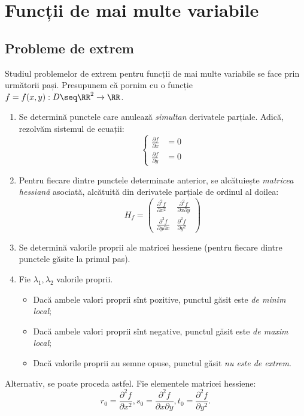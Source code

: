 \chapter{Funcții de mai multe variabile}

\section{Probleme de extrem}

Studiul problemelor de extrem pentru funcții de mai multe variabile
se face prin următorii pași. Presupunem că pornim cu o funcție
$ f = f(x, y) : D \seq \RR^2 \to \RR $.

\begin{enumerate}[(1)]
\item Se determină punctele care anulează \emph{simultan} derivatele
  parțiale. Adică, rezolvăm sistemul de ecuații:
  \[
    \begin{cases}
      \frac{\partial f}{\partial x} &= 0 \\
      \frac{\partial f}{\partial y} &= 0
    \end{cases}
  \]
\item Pentru fiecare dintre punctele determinate anterior, se alcătuiește
  \emph{matricea hessiană} asociată, alcătuită din derivatele parțiale
  de ordinul al doilea: 
  \[
    H_f =
    \begin{pmatrix}
      \frac{\partial^2 f}{\partial x^2} & \frac{\partial^2 f}{\partial x \partial y} \\
      \frac{\partial^2 f}{\partial y \partial x} & \frac{\partial^2 f}{\partial y^2}
    \end{pmatrix}
  \]
\item Se determină valorile proprii ale matricei hessiene (pentru fiecare dintre
  punctele găsite la primul pas).
\item Fie $ \lambda_1, \lambda_2 $ valorile proprii.
  \begin{itemize}
  \item Dacă ambele valori proprii sînt pozitive, punctul găsit este \emph{de minim local};
  \item Dacă ambele valori proprii sînt negative, punctul găsit este \emph{de maxim local};
  \item Dacă valorile proprii au semne opuse, punctul găsit \emph{nu este de extrem}.
  \end{itemize}
\end{enumerate}

Alternativ, se poate proceda astfel. Fie elementele matricei hessiene:
\[
  r_0 = \frac{\partial^2 f}{\partial x^2}, s_0 = \frac{\partial^2 f}{\partial x \partial y}, %
  t_0 = \frac{\partial^2 f}{\partial y^2}.
\]

